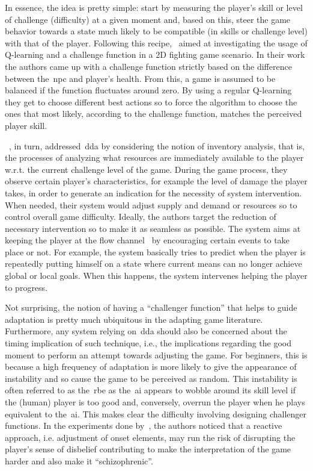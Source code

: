In essence, the idea is pretty simple: start by measuring the player's skill or level of challenge (difficulty) at a given moment and, based on this, steer the game behavior towards a state much likely to be compatible (in skills or challenge level) with that of the player. Following this recipe,~\cite{andrade_online_2004, andrade_extending_2005} aimed at investigating the usage of Q-learning and a challenge function in a 2D fighting game scenario. In their work the authors came up with a challenge function strictly based on the difference between the~\gls{npc} and player's health. From this, a game is assumed to be balanced if the function fluctuates around zero. By using a regular Q-learning they get to choose different best actions so to force the algorithm to choose the ones that most likely, according to the challenge function, matches the perceived player skill. 

~\cite{hunicke_ai_2004}, in turn, addressed~\gls{dda} by considering the notion of inventory analysis, that is, the processes of analyzing what resources are immediately available to the player w.r.t. the current challenge level of the game. During the game process, they observe certain player's characteristics, for example the level of damage the player takes, in order to generate an indication for the necessity of system intervention. When needed, their system would adjust supply and demand or resources so to control overall game difficulty. Ideally, the authors target the reduction of necessary intervention so to make it as seamless as possible. The system aims at keeping the player at the flow channel~\citep{csikszentmihalyi_flow:_1991} by encouraging certain events to take place or not. For example, the system basically tries to predict when the player is repeatedly putting himself on a state where current means can no longer achieve global or local goals.
When this happens, the system intervenes helping the player to progress.

Not surprising, the notion of having a ``challenger function'' that helps to guide adaptation is pretty much ubiquitous in the adapting game literature. Furthermore, any system relying on~\gls{dda} should also be concerned about the timing implication of such technique, i.e., the implications regarding the good moment to perform an attempt towards adjusting the game. For beginners, this is because a high frequency of adaptation is more likely to give the appearance of instability and so cause the game to be perceived as random. This instability is often referred to as the~\gls{rbe} as the~\gls{ai} appears to wobble around its skill level if the (human) player is too good and, conversely, overrun the player when he plays equivalent to the~\gls{ai}. This makes clear the difficulty involving designing challenger functions. In the experiments done by~\cite{hunicke_ai_2004}, the authors noticed that a reactive approach, i.e. adjustment of onset elements, may run the risk of disrupting the player's sense of disbelief contributing to make the interpretation of the game harder and also make it ``schizophrenic''.


